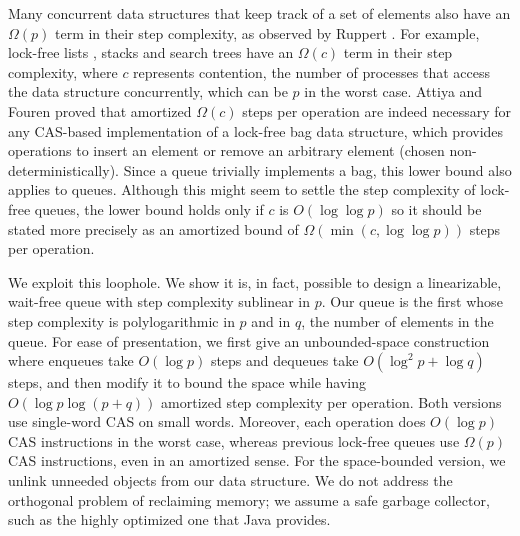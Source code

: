 Many concurrent data structures that keep track of a set of elements also have an $\Omega(p)$ term in their step complexity, as observed by Ruppert \cite{Rup16}.
For example, lock-free lists \cite{FR04,Sha15}, stacks \cite{Tre86} and search trees \cite{EFHR14} 
have an $\Omega(c)$ term in their step complexity, where $c$ represents contention,
the number of processes that access the data structure concurrently, which can be $p$ in the worst case.
Attiya and Fouren \cite{DBLP:conf/opodis/AttiyaF17} proved 
that amortized $\Omega(c)$ steps per operation are indeed necessary
for any CAS-based implementation of a lock-free bag data structure, which provides operations
to insert an element or remove an arbitrary element (chosen non-deterministically).
Since a queue trivially implements a bag, this lower bound also applies to queues.
Although this might seem to settle the step complexity of lock-free queues, the lower bound
holds only if $c$ is $O(\log\log p)$ so it should be stated more precisely as
an amortized bound of $\Omega(\min(c,\log\log p))$ steps per operation.

We exploit this loophole.  We show  it is, in fact, possible to design a linearizable, wait-free queue
with step complexity sublinear in $p$.
Our queue is the first whose step complexity  is polylogarithmic in $p$ and in $q$, the number of elements in the queue.
For ease of presentation, we first give an unbounded-space construction where enqueues take $O(\log p)$ steps and
dequeues take $O(\log^2 p + \log q)$ steps,
and then modify it to bound the space
while  having $O(\log p\log( p+ q))$ amortized step complexity  per operation.
Both versions use single-word CAS on %
small words.
Moreover, each operation does $O(\log p)$ CAS instructions in the worst case, whereas previous
lock-free queues use 
$\Omega(p)$ CAS instructions, even in an amortized sense.
For the space-bounded version, we unlink unneeded objects from our data structure.
We do not address the orthogonal problem of reclaiming memory; we assume a safe
garbage collector, such as the highly optimized one that Java provides.

